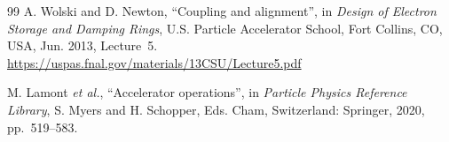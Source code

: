 \documentclass[letterpaper]{jacow}
\begin{document}
\begin{thebibliography}{99}
    A. Wolski and D. Newton, ``Coupling and alignment'', in
    \textit{Design of Electron Storage and Damping Rings}, U.S. Particle
    Accelerator School, Fort Collins, CO, USA, Jun. 2013, Lecture~5.
    \url{https://uspas.fnal.gov/materials/13CSU/Lecture5.pdf}

    M. Lamont \textit{et al.}, ``Accelerator operations'', in
    \textit{Particle Physics Reference Library}, S. Myers and H. Schopper,
    Eds. Cham, Switzerland: Springer, 2020, pp.~519--583.

\end{thebibliography}
\end{document}
